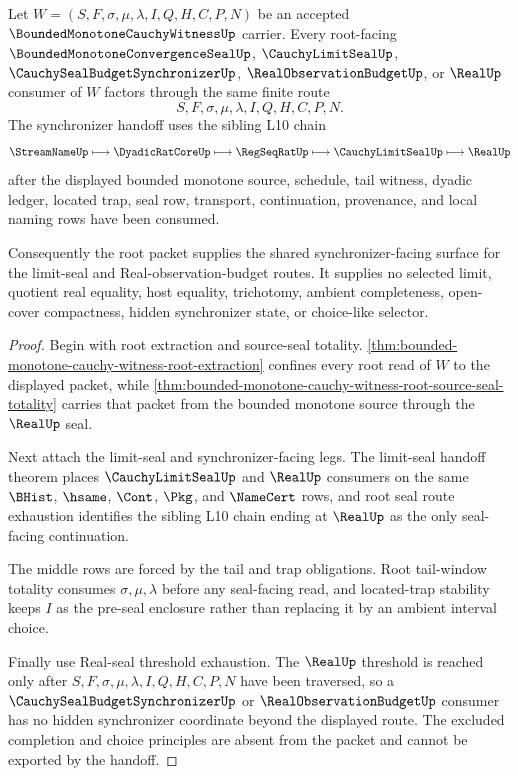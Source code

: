 \begin{theorem}
\label{thm:bounded-monotone-cauchy-witness-root-synchronizer-handoff}
Let $W=(S,F,\sigma,\mu,\lambda,I,Q,H,C,P,N)$ be an accepted $\BoundedMonotoneCauchyWitnessUp$ carrier. Every root-facing $\BoundedMonotoneConvergenceSealUp$, $\CauchyLimitSealUp$, $\CauchySealBudgetSynchronizerUp$, $\RealObservationBudgetUp$, or $\RealUp$ consumer of $W$ factors through the same finite route
$$
S,F,\sigma,\mu,\lambda,I,Q,H,C,P,N.
$$
The synchronizer handoff uses the sibling L10 chain
$$
\StreamNameUp \longmapsto \DyadicRatCoreUp \longmapsto \RegSeqRatUp \longmapsto \CauchyLimitSealUp \longmapsto \RealUp
$$
after the displayed bounded monotone source, schedule, tail witness, dyadic ledger, located trap, seal row, transport, continuation, provenance, and local naming rows have been consumed.

Consequently the root packet supplies the shared synchronizer-facing surface for the limit-seal and Real-observation-budget routes. It supplies no selected limit, quotient real equality, host equality, trichotomy, ambient completeness, open-cover compactness, hidden synchronizer state, or choice-like selector.
\end{theorem}
\begin{proof}
Begin with root extraction and source-seal totality. \autoref{thm:bounded-monotone-cauchy-witness-root-extraction} confines every root read of $W$ to the displayed packet, while \autoref{thm:bounded-monotone-cauchy-witness-root-source-seal-totality} carries that packet from the bounded monotone source through the $\RealUp$ seal.

Next attach the limit-seal and synchronizer-facing legs. The limit-seal handoff theorem places $\CauchyLimitSealUp$ and $\RealUp$ consumers on the same $\BHist$, $\hsame$, $\Cont$, $\Pkg$, and $\NameCert$ rows, and root seal route exhaustion identifies the sibling L10 chain ending at $\RealUp$ as the only seal-facing continuation.

The middle rows are forced by the tail and trap obligations. Root tail-window totality consumes $\sigma,\mu,\lambda$ before any seal-facing read, and located-trap stability keeps $I$ as the pre-seal enclosure rather than replacing it by an ambient interval choice.

Finally use Real-seal threshold exhaustion. The $\RealUp$ threshold is reached only after $S,F,\sigma,\mu,\lambda,I,Q,H,C,P,N$ have been traversed, so a $\CauchySealBudgetSynchronizerUp$ or $\RealObservationBudgetUp$ consumer has no hidden synchronizer coordinate beyond the displayed route. The excluded completion and choice principles are absent from the packet and cannot be exported by the handoff.
\end{proof}

